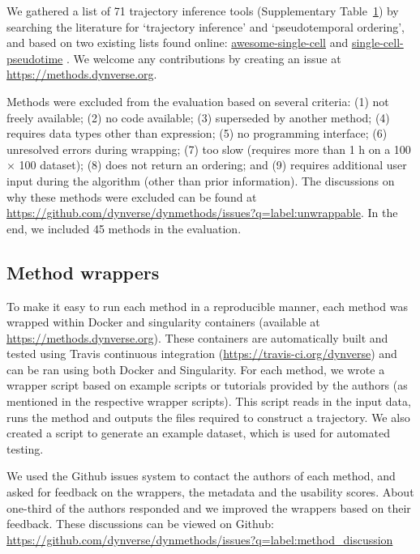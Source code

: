 We gathered a list of 71 trajectory inference tools (Supplementary Table~\href{https://static-content.springer.com/esm/art\%3A10.1038\%2Fs41587-019-0071-9/MediaObjects/41587\_2019\_71\_MOESM3\_ESM.xlsx}{1}) by searching the literature for ‘trajectory inference’ and ‘pseudotemporal ordering’, and based on two existing lists found online: \href{https://github.com/seandavi/awesome-single-cell}{awesome-single-cell} \cite{davis_awesomesinglecell_2018} and \href{https://github.com/agitter/single-cell-pseudotime}{single-cell-pseudotime} \cite{gitter_singlecellrnaseqpseudotime_2018}. We welcome any contributions by creating an issue at \href{https://methods.dynverse.org}{https://methods.dynverse.org}.

Methods were excluded from the evaluation based on several criteria: (1) not freely available; (2) no code available; (3) superseded by another method; (4) requires data types other than expression; (5) no programming interface; (6) unresolved errors during wrapping; (7) too slow (requires more than 1 h on a 100 $\times$ 100 dataset); (8) does not return an ordering; and (9) requires additional user input during the algorithm (other than prior information). The discussions on why these methods were excluded can be found at \href{https://github.com/dynverse/dynmethods/issues?q=label:unwrappable}{https://github.com/dynverse/dynmethods/issues?q=label:unwrappable}. In the end, we included 45 methods in the evaluation.


\subsection{Method wrappers}

To make it easy to run each method in a reproducible manner, each method was wrapped within Docker and singularity containers (available at \href{https://methods.dynverse.org}{https://methods.dynverse.org}). These containers are automatically built and tested using Travis continuous integration (\href{https://travis-ci.org/dynverse}{https://travis-ci.org/dynverse}) and can be ran using both Docker and Singularity. For each method, we wrote a wrapper script based on example scripts or tutorials provided by the authors (as mentioned in the respective wrapper scripts). This script reads in the input data, runs the method and outputs the files required to construct a trajectory. We also created a script to generate an example dataset, which is used for automated testing.

We used the Github issues system to contact the authors of each method, and asked for feedback on the wrappers, the metadata and the usability scores. About one-third of the authors responded and we improved the wrappers based on their feedback. These discussions can be viewed on Github: \href{https://github.com/dynverse/dynmethods/issues?q=label:method_discussion}{https://github.com/dynverse/dynmethods/issues?q=label:method\_discussion}

